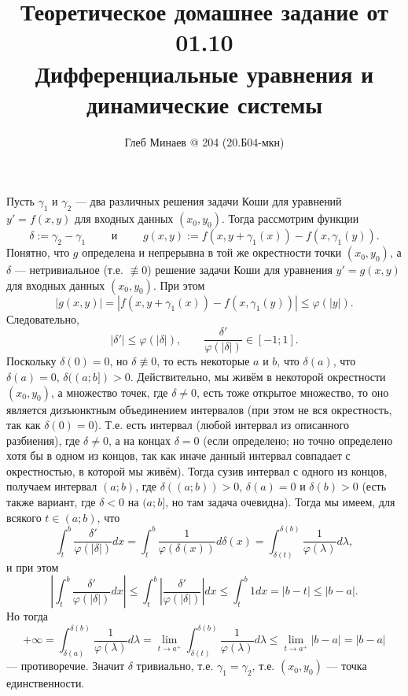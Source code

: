 \documentclass[12pt,a4paper]{article}
\title{Теоретическое домашнее задание от 01.10\\Дифференциальные уравнения и динамические системы}
\author{Глеб Минаев @ 204 (20.Б04-мкн)}
\begin{document}
    \maketitle
    
    \begin{problem}{5}
        Пусть $\gamma_1$ и $\gamma_2$ --- два различных решения задачи Коши для уравнений $y' = f(x, y)$ для входных данных $(x_0, y_0)$. Тогда рассмотрим функции
        \[
            \delta := \gamma_2 - \gamma_1
            \qquad \text{ и } \qquad
            g(x, y) := f(x, y + \gamma_1(x)) - f(x, \gamma_1(y)).
        \]
        Понятно, что $g$ определена и непрерывна в той же окрестности точки $(x_0, y_0)$, а $\delta$ --- нетривиальное (т.е. $\not\equiv 0$) решение задачи Коши для уравнения $y' = g(x, y)$ для входных данных $(x_0, y_0)$. При этом
        \[
            |g(x, y)| = |f(x, y + \gamma_1(x)) - f(x, \gamma_1(y))| \leqslant \varphi(|y|).
        \]
        Следовательно,
        \[|\delta'| \leqslant \varphi(|\delta|), \qquad \frac{\delta'}{\varphi(|\delta|)} \in [-1; 1].\]
        Поскольку $\delta(0) = 0$, но $\delta \not\equiv 0$, то есть некоторые $a$ и $b$, что $\delta(a)$, что $\delta(a) = 0$, $\delta((a; b]) > 0$. Действительно, мы живём в некоторой окрестности $(x_0, y_0)$, а множество точек, где $\delta \neq 0$, есть тоже открытое множество, то оно является дизъюнктным объединением интервалов (при этом не вся окрестность, так как $\delta(0) = 0$). Т.е. есть интервал (любой интервал из описанного разбиения), где $\delta \neq 0$, а на концах $\delta = 0$ (если определено; но точно определено хотя бы в одном из концов, так как иначе данный интервал совпадает с окрестностью, в которой мы живём). Тогда сузив интервал с одного из концов, получаем интервал $(a; b)$, где $\delta((a; b)) > 0$, $\delta(a) = 0$ и $\delta(b) > 0$ (есть также вариант, где $\delta < 0$ на $(a; b]$, но там задача очевидна). Тогда мы имеем, для всякого $t \in (a; b)$, что
        \[
            \int_t^b \frac{\delta'}{\varphi(|\delta|)} dx
            = \int_t^b \frac{1}{\varphi(\delta(x))} d\delta(x)
            = \int_{\delta(t)}^{\delta(b)} \frac{1}{\varphi(\lambda)} d\lambda,
        \]
        и при этом
        \[
            \left|\int_t^b \frac{\delta'}{\varphi(|\delta|)} dx\right|
            \leqslant \int_t^b \left|\frac{\delta'}{\varphi(|\delta|)}\right| dx
            \leqslant \int_t^b 1 dx
            = |b - t|
            \leqslant |b-a|.
        \]
        Но тогда
        \[
            +\infty
            = \int_{\delta(a)}^{\delta(b)} \frac{1}{\varphi(\lambda)} d\lambda
            = \lim_{t \to a^+} \int_{\delta(t)}^{\delta(b)} \frac{1}{\varphi(\lambda)} d\lambda
            \leqslant \lim_{t \to a^+} |b-a|
            = |b-a|
        \]
        --- противоречие. Значит $\delta$ тривиально, т.е. $\gamma_1 = \gamma_2$, т.е. $(x_0, y_0)$ --- точка единственности.
    \end{problem}
\end{document}
